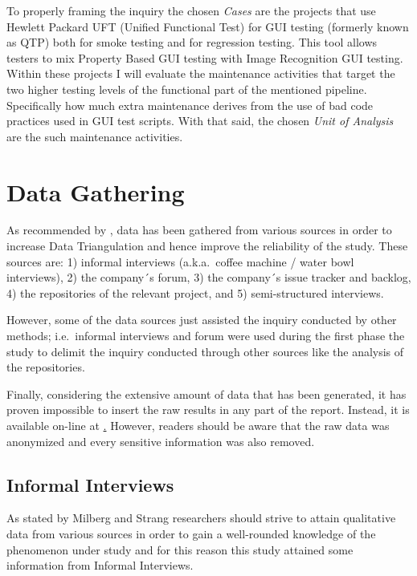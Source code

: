 To properly framing the inquiry the chosen \textit{Cases} are the projects that use Hewlett Packard UFT (Unified Functional Test) for GUI testing (formerly known as QTP) both for smoke testing and for regression testing. This tool allows testers to mix Property Based GUI testing with Image Recognition GUI testing. Within these projects I will evaluate the maintenance activities that target the two higher testing levels of the functional part of the mentioned pipeline. Specifically how much extra maintenance derives from the use of bad code practices used in GUI test scripts. With that said, the chosen \textit{Unit of Analysis} are the such maintenance activities. 
    

%
%
%
%

%
%
%
%
\section{Data Gathering}
As recommended by \cite{case_study_guide,case_study_software_engineering}, data has been gathered from various sources in order to increase Data Triangulation and hence improve the reliability of the study. These sources are: 1) informal interviews (a.k.a.\ coffee machine / water bowl interviews), 2) the company´s forum, 3) the company´s issue tracker and backlog, 4) the repositories of the relevant project, and 5) semi-structured interviews.

However, some of the data sources just assisted the inquiry conducted by other methods; i.e.\ informal interviews and forum were used during the first phase the study to delimit the inquiry conducted through other sources like the analysis of the repositories.

Finally, considering the extensive amount of data that has been generated, it has proven impossible to insert the raw results in any part of the report. Instead, it is available on-line at \href{http://???/}. However, readers should be aware that the raw data was anonymized and every sensitive information was also removed. 


\subsection{Informal Interviews}
As stated by Milberg and Strang \cite{informal_interview} researchers should strive to attain qualitative data from various sources in order to gain a well-rounded knowledge of the phenomenon under study and for this reason this study attained some information from Informal Interviews.

